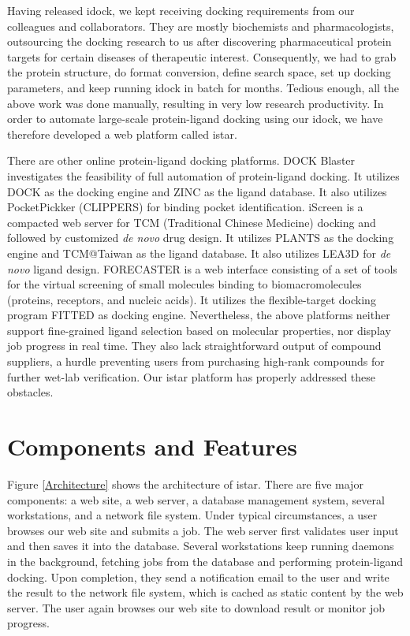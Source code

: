 \documentclass[10pt]{article}
\begin{document}
Having released idock, we kept receiving docking requirements from our colleagues and collaborators. They are mostly biochemists and pharmacologists, outsourcing the docking research to us after discovering pharmaceutical protein targets for certain diseases of therapeutic interest. Consequently, we had to grab the protein structure, do format conversion, define search space, set up docking parameters, and keep running idock in batch for months. Tedious enough, all the above work was done manually, resulting in very low research productivity. In order to automate large-scale protein-ligand docking using our idock, we have therefore developed a web platform called istar.

There are other online protein-ligand docking platforms. DOCK Blaster \cite{557} investigates the feasibility of full automation of protein-ligand docking. It utilizes DOCK \cite{1222} as the docking engine and ZINC \cite{532,1178} as the ligand database. It also utilizes PocketPickker (CLIPPERS) \cite{395} for binding pocket identification. iScreen \cite{899} is a compacted web server for TCM (Traditional Chinese Medicine) docking and followed by customized \textit{de novo} drug design. It utilizes PLANTS \cite{610,607,779} as the docking engine and TCM@Taiwan \cite{528} as the ligand database. It also utilizes LEA3D \cite{1223} for \textit{de novo} ligand design. FORECASTER \cite{1012} is a web interface consisting of a set of tools for the virtual screening of small molecules binding to biomacromolecules (proteins, receptors, and nucleic acids). It utilizes the flexible-target docking program FITTED \cite{602} as docking engine. Nevertheless, the above platforms neither support fine-grained ligand selection based on molecular properties, nor display job progress in real time. They also lack straightforward output of compound suppliers, a hurdle preventing users from purchasing high-rank compounds for further wet-lab verification. Our istar platform has properly addressed these obstacles.

\section*{Components and Features}
Figure \ref{Architecture} shows the architecture of istar. There are five major components: a web site, a web server, a database management system, several workstations, and a network file system. Under typical circumstances, a user browses our web site and submits a job. The web server first validates user input and then saves it into the database. Several workstations keep running daemons in the background, fetching jobs from the database and performing protein-ligand docking. Upon completion, they send a notification email to the user and write the result to the network file system, which is cached as static content by the web server. The user again browses our web site to download result or monitor job progress.
\end{document}
